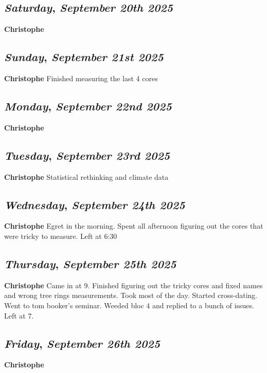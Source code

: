 \def\day{\textit{September 20th 2025}}
\def\weekday{\textit{Saturday}}
\subsection*{\weekday, \day}
\textbf {Christophe}

\def\day{\textit{September 21st 2025}}
\def\weekday{\textit{Sunday}}
\subsection*{\weekday, \day}
\textbf {Christophe}
Finished measuring the last 4 cores

\def\day{\textit{September 22nd 2025}}
\def\weekday{\textit{Monday}}
\subsection*{\weekday, \day}
\textbf {Christophe}

\def\day{\textit{September 23rd 2025}}
\def\weekday{\textit{Tuesday}}
\subsection*{\weekday, \day}
\textbf {Christophe}
Statistical rethinking and climate data

\def\day{\textit{September 24th 2025}}
\def\weekday{\textit{Wednesday}}
\subsection*{\weekday, \day}
\textbf {Christophe}
Egret in the morning. Spent all afternoon figuring out the cores that were tricky to measure. Left at 6:30

\def\day{\textit{September 25th 2025}}
\def\weekday{\textit{Thursday}}
\subsection*{\weekday, \day}
\textbf {Christophe}
Came in at 9. Finished figuring out the tricky cores and fixed names and wrong tree rings measurements. Took most of the day. Started cross-dating. Went to tom booker's seminar. Weeded bloc 4 and replied to a bunch of issues. Left at 7.
\def\day{\textit{September 26th 2025}}
\def\weekday{\textit{Friday}}
\subsection*{\weekday, \day}
\textbf {Christophe}

